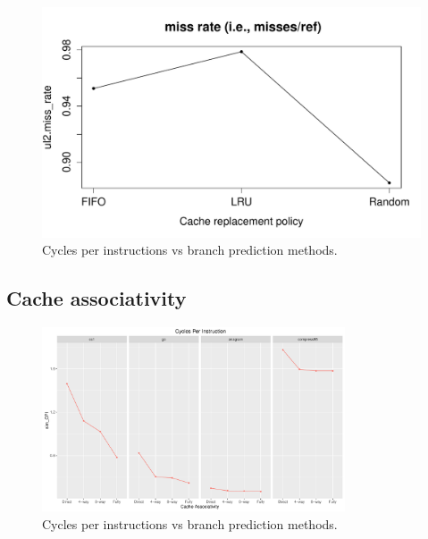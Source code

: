 \documentclass[10pt]{scrartcl}
\begin{document}
\begin{figure}[!htb]
\endminipage
{}%
  \includegraphics[trim={1cm 1.2cm 0 1.8cm},clip,width=\linewidth]{NewPlots/plot_RP_G_miss_rate}
\endminipage
\caption{Cycles per instructions vs branch prediction methods.}\label{fig:cache-rp_miss_rate}
\end{figure}

\FloatBarrier

\subsection{Cache associativity}

\begin{figure}[h]
  \centering
  \includegraphics[width=0.8\textwidth]{Plots/plot_CacheA_sim_CPI}
  \caption{Cycles per instructions vs branch prediction methods.}\label{fig:cache-a_sim_cpi}
\end{figure}
\end{document}

